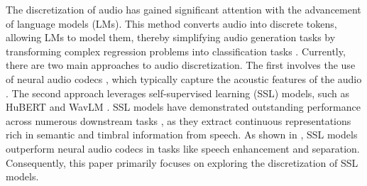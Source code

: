 \documentclass[conference]{IEEEtran}
\begin{document}
The discretization of audio has gained significant attention with the advancement of language models (LMs). This method converts audio into discrete tokens, allowing LMs to model them, thereby simplifying audio generation tasks by transforming complex regression problems into classification tasks \cite{dasb}. Currently, there are two main approaches to audio discretization. The first involves the use of neural audio codecs \cite{dac}, which typically capture the acoustic features of the audio \cite{speech_tokenizer}. The second approach leverages self-supervised learning (SSL) models, such as HuBERT \cite{hubert} and WavLM \cite{wavlm}. SSL models have demonstrated outstanding performance across numerous downstream tasks \cite{superb}, as they extract continuous representations rich in semantic and timbral information from speech. As shown in \cite{dasb}, SSL models outperform neural audio codecs in tasks like speech enhancement and separation. Consequently, this paper primarily focuses on exploring the discretization of SSL models.
\end{document}
